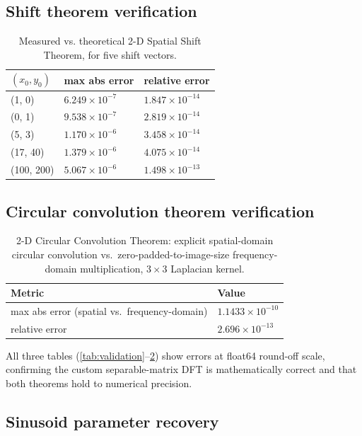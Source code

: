 \documentclass[11pt]{article}
\begin{document}
\subsection{Shift theorem verification}

\begin{table}[H]
\centering
\begin{tabular}{@{}lll@{}}
\toprule
$(x_0,y_0)$ & max abs error & relative error \\
\midrule
(1, 0)     & $6.249\times10^{-7}$ & $1.847\times10^{-14}$ \\
(0, 1)     & $9.538\times10^{-7}$ & $2.819\times10^{-14}$ \\
(5, 3)     & $1.170\times10^{-6}$ & $3.458\times10^{-14}$ \\
(17, 40)   & $1.379\times10^{-6}$ & $4.075\times10^{-14}$ \\
(100, 200) & $5.067\times10^{-6}$ & $1.498\times10^{-13}$ \\
\bottomrule
\end{tabular}
\caption{Measured vs. theoretical 2-D Spatial Shift Theorem, for five shift vectors.}
\label{tab:shift}
\end{table}

\subsection{Circular convolution theorem verification}

\begin{table}[H]
\centering
\begin{tabular}{@{}ll@{}}
\toprule
Metric & Value \\
\midrule
max abs error (spatial vs.\ frequency-domain) & $1.1433\times10^{-10}$ \\
relative error & $2.696\times10^{-13}$ \\
\bottomrule
\end{tabular}
\caption{2-D Circular Convolution Theorem: explicit spatial-domain circular convolution vs.\
zero-padded-to-image-size frequency-domain multiplication, $3\times3$ Laplacian kernel.}
\label{tab:conv}
\end{table}

All three tables (\ref{tab:validation}--\ref{tab:conv}) show errors at float64 round-off scale,
confirming the custom separable-matrix DFT is mathematically correct and that both theorems hold
to numerical precision.

\subsection{Sinusoid parameter recovery}
\end{document}
